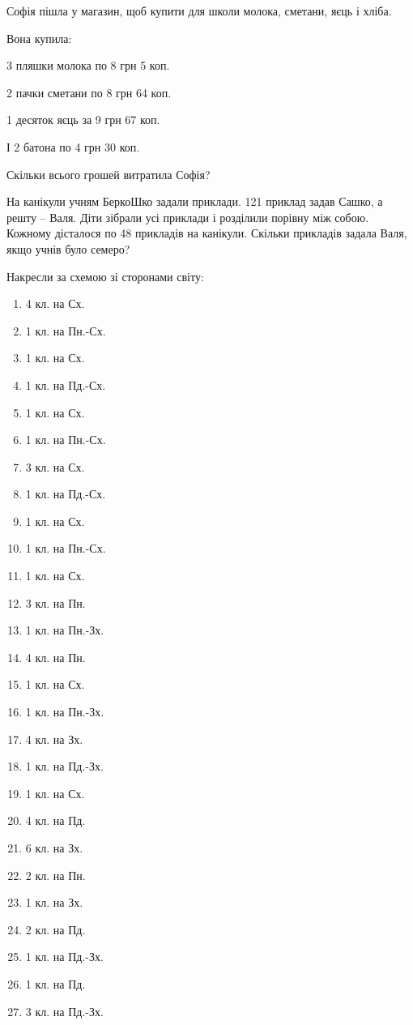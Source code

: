 \problem
Софія пішла у магазин, щоб купити для школи молока, сметани, яєць і хліба.

Вона купила:

3 пляшки молока по 8 грн 5 коп.

2 пачки сметани по 8 грн 64 коп.

1 десяток яєць за 9 грн 67 коп.

І 2 батона по 4 грн 30 коп.

Скільки всього грошей витратила Софія?


\problem
На канікули учням БеркоШко задали приклади.
121 приклад задав Сашко, а решту – Валя.
Діти зібрали усі приклади і розділили порівну між собою.
Кожному дісталося по 48 прикладів на канікули.
Скільки прикладів задала Валя, якщо учнів було семеро?


\problem
Накресли за схемою зі сторонами світу:
\begin{multicols}{2}
    \begin{enumerate}
        \item 4 кл. на Сх.
        \item 1 кл. на Пн.-Сх.
        \item 1 кл. на Сх.
        \item 1 кл. на Пд.-Сх.
        \item 1 кл. на Сх.
        \item 1 кл. на Пн.-Сх.
        \item 3 кл. на Сх.
        \item 1 кл. на Пд.-Сх.
        \item 1 кл. на Сх.
        \item 1 кл. на Пн.-Сх.
        \item 1 кл. на Сх.
        \item 3 кл. на Пн.
        \item 1 кл. на Пн.-Зх.
        \item 4 кл. на Пн.
        \item 1 кл. на Сх.
        \item 1 кл. на Пн.-Зх.
        \item 4 кл. на Зх.
        \item 1 кл. на Пд.-Зх.
        \item 1 кл. на Сх.
        \item 4 кл. на Пд.
        \item 6 кл. на Зх.
        \item 2 кл. на Пн.
        \item 1 кл. на Зх.
        \item 2 кл. на Пд.
        \item 1 кл. на Пд.-Зх.
        \item 1 кл. на Пд.
        \item 3 кл. на Пд.-Зх.
    \end{enumerate}
\end{multicols}


